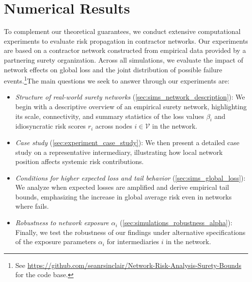 \documentclass[mnsc,nonblindrev]{informs3}
\newcommand{\GAR}{\mathcal{L}}
\newcommand{\Xvec}{\mathbf{X}}
\newcommand{\V}{\mathcal{V}}
\begin{document}

\section{Numerical Results}
\label{sec:experiments}

To complement our theoretical guarantees, we conduct extensive computational experiments to evaluate risk propagation in contractor networks. Our experiments are based on a contractor network constructed from empirical data provided by a partnering surety organization. Across all simulations, we evaluate the impact of network effects on global loss and the joint distribution of possible failure events.\ifdefined\arxiv\footnote{See \url{https://github.com/seanrsinclair/Network-Risk-Analysis-Surety-Bounds} for the code base.}\else\fi  The main questions we seek to answer through our experiments are:
\begin{itemize}
    \item {\em Structure of real-world surety networks} (\cref{sec:sims_network_description}): We begin with a descriptive overview of an empirical surety network, highlighting its scale, connectivity, and summary statistics of the loss values $\beta_i$ and idiosyncratic risk scores $r_i$ across nodes $i \in \V$ in the network.
    \item {\em Case study} (\cref{sec:experiment_case_study}): We then present a detailed case study on a representative intermediary, illustrating how local network position affects systemic risk contributions.
    \item {\em Conditions for higher expected loss and tail behavior} (\cref{sec:sims_global_loss}): We analyze when expected losses are amplified and derive empirical tail bounds, emphasizing the increase in global average risk even in networks where  fails.
    \item {\em Robustness to network exposure $\alpha_i$} (\cref{sec:simulations_robustness_alpha}): Finally, we test the robustness of our findings under alternative specifications of the exposure parameters $\alpha_i$ for intermediaries $i$ in the network.
\end{itemize}
\end{document}
